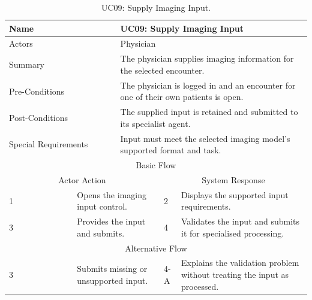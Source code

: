 \begin{table}[htbp]
\centering
\small
\caption{UC09: Supply Imaging Input.}
\label{tab:kashaf:uc09}
\begin{tabular}{|p{}|p{}|p{}|p{}|p{}|}
\hline
\multicolumn{2}{|p{\dimexpr0.225\textwidth+2\tabcolsep+\arrayrulewidth\relax}|}{Name} & \multicolumn{3}{p{\dimexpr0.575\textwidth+4\tabcolsep+2\arrayrulewidth\relax}|}{UC09: Supply Imaging Input} \\ \hline
\multicolumn{2}{|p{\dimexpr0.225\textwidth+2\tabcolsep+\arrayrulewidth\relax}|}{Actors} & \multicolumn{3}{p{\dimexpr0.575\textwidth+4\tabcolsep+2\arrayrulewidth\relax}|}{Physician} \\ \hline
\multicolumn{2}{|p{\dimexpr0.225\textwidth+2\tabcolsep+\arrayrulewidth\relax}|}{Summary} & \multicolumn{3}{p{\dimexpr0.575\textwidth+4\tabcolsep+2\arrayrulewidth\relax}|}{The physician supplies imaging information for the selected encounter.} \\ \hline
\multicolumn{2}{|p{\dimexpr0.225\textwidth+2\tabcolsep+\arrayrulewidth\relax}|}{Pre-Conditions} & \multicolumn{3}{p{\dimexpr0.575\textwidth+4\tabcolsep+2\arrayrulewidth\relax}|}{The physician is logged in and an encounter for one of their own patients is open.} \\ \hline
\multicolumn{2}{|p{\dimexpr0.225\textwidth+2\tabcolsep+\arrayrulewidth\relax}|}{Post-Conditions} & \multicolumn{3}{p{\dimexpr0.575\textwidth+4\tabcolsep+2\arrayrulewidth\relax}|}{The supplied input is retained and submitted to its specialist agent.} \\ \hline
\multicolumn{2}{|p{\dimexpr0.225\textwidth+2\tabcolsep+\arrayrulewidth\relax}|}{Special Requirements} & \multicolumn{3}{p{\dimexpr0.575\textwidth+4\tabcolsep+2\arrayrulewidth\relax}|}{Input must meet the selected imaging model's supported format and task.} \\ \hline
\multicolumn{5}{|c|}{Basic Flow} \\ \hline
\multicolumn{3}{|c|}{Actor Action} & \multicolumn{2}{c|}{System Response} \\ \hline
1 & \multicolumn{2}{p{\dimexpr0.37\textwidth+2\tabcolsep+\arrayrulewidth\relax}|}{Opens the imaging input control.} & 2 & Displays the supported input requirements. \\ \hline
3 & \multicolumn{2}{p{\dimexpr0.37\textwidth+2\tabcolsep+\arrayrulewidth\relax}|}{Provides the input and submits.} & 4 & Validates the input and submits it for specialised processing. \\ \hline
\multicolumn{5}{|c|}{Alternative Flow} \\ \hline
3 & \multicolumn{2}{p{\dimexpr0.37\textwidth+2\tabcolsep+\arrayrulewidth\relax}|}{Submits missing or unsupported input.} & 4-A & Explains the validation problem without treating the input as processed. \\ \hline
\end{tabular}
\end{table}

